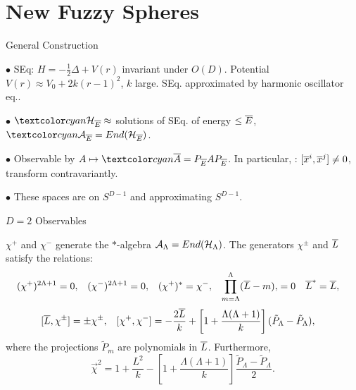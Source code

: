 \section{New Fuzzy Spheres}

\begin{frame}{General Construction} %
    
    $\bullet$  SEq: $H = - \frac{1}{2} \Delta + V(r)$ invariant under $O(D)$. Potential $V(r) \approx V_0 + 2k(r-1)^2$, $k$ large. SEq. approximated by harmonic oscillator eq..
    
    $\bullet$ $\lbtext{\hcal_{\cut E}} \approx $ solutions of SEq. of energy $\leq \overline{E}$, $\lbtext{\acal_{\cut E}} = End(\hcal_{\cut E})$.
    
    $\bullet$ Observable by $A \mapsto \lbtext{\cut A} = P_{\cut E} A P_{\cut E}$. In particular, : $[\overline{x}^i, \overline{x}^j] \neq 0$, transform contravariantly.
    
    $\bullet$ These spaces are  on $S^{D-1}$ and  approximating $S^{D-1}$.
    
\end{frame}

\begin{frame}{$D = 2$ Observables} %
    
    $\chi^+$ and $\chi^-$ generate the $*$-algebra $\mathcal A_\Lambda = End(\mathcal H_\Lambda)$. The generators $\chi^\pm$ and $\overline{L}$ satisfy  the relations:
\begin{align}\label{equationOperatorFormulaRelationsChiD2}
    (\chi^+)^{2\Lambda+1} &= 0, & 
    (\chi^-)^{2\Lambda+1} &= 0, & 
    (\chi^+)^*&= \chi^-, & 
    \prod_{m = \Lambda}^\Lambda (\overline{L} - m), &= 0 & 
    \overline{L}^* &= \overline{L},
\end{align}
\begin{align}\label{equationOperatorFormulaCommutatorsChiD2}
    [\overline{L}, \chi^\pm] &= \pm \chi^\pm,&
    [\chi^+, \chi^-] &= - \frac{2\overline{L}}{k} + \left[ 1 + \frac{\Lambda(\Lambda+1)}{k}\right](\tilde P_\Lambda - \tilde P_\Lambda),
\end{align}
where the projections $\tilde P_m$ are polynomials in $\overline{L}$. Furthermore,
\begin{equation}\label{equationOperatorFormulaRChiD2}
    \vec \chi^2 = 1 + \frac{L^2}{k} - \left[ 1 + \frac{\Lambda(\Lambda+1)}{k}\right]\frac{\tilde P_\Lambda - \tilde P_\Lambda}{2}.
\end{equation}

\end{frame}

